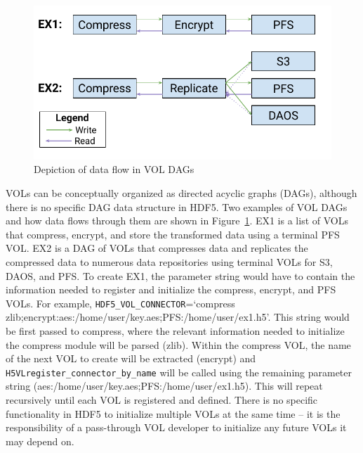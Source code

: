 \begin{figure}[!ht]
  \centering
  \includegraphics{images/tour_4_vol_dags.pdf}
  \caption{Depiction of data flow in VOL DAGs}
  \label{fig:vol-dag}
\end{figure}

VOLs can be conceptually organized as directed acyclic graphs (DAGs), although there is no specific DAG data structure in HDF5. Two examples of VOL DAGs and how data flows through them are shown in Figure~\ref{fig:vol-dag}. EX1 is a list of VOLs that compress, encrypt, and store the transformed data using a terminal PFS VOL. EX2 is a DAG of VOLs that compresses data and replicates the compressed data to numerous data repositories using terminal VOLs for S3, DAOS, and PFS. To create EX1, the parameter string would have to contain the information needed to register and initialize the compress, encrypt, and PFS VOLs. For example, \texttt{HDF5\_VOL\_CONNECTOR}=`compress zlib;encrypt:aes:/home/user/key.aes;PFS:/home/user/ex1.h5'. This string would be first passed to compress, where the relevant information needed to initialize the compress module will be parsed (zlib). Within the compress VOL, the name of the next VOL to create will be extracted (encrypt) and \texttt{H5VLregister\_connector\_by\_name} will be called using the remaining parameter string (aes:/home/user/key.aes;PFS:/home/user/ex1.h5). This will repeat recursively until each VOL is registered and defined. There is no specific functionality in HDF5 to initialize multiple VOLs at the same time -- it is the responsibility of a pass-through VOL developer to initialize any future VOLs it may depend on.

